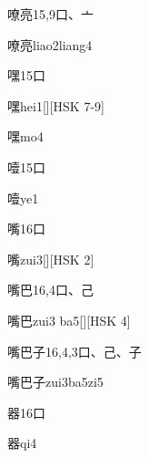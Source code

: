 \begin{Entry}{嘹亮}{15,9}{⼝、⼇}
  \begin{Phonetics}{嘹亮}{liao2liang4}
  \end{Phonetics}
\end{Entry}

\begin{Entry}{嘿}{15}{⼝}
  \begin{Phonetics}{嘿}{hei1}[][HSK 7-9]
  \end{Phonetics}
  \begin{Phonetics}{嘿}{mo4}
  \end{Phonetics}
\end{Entry}

\begin{Entry}{噎}{15}{⼝}
  \begin{Phonetics}{噎}{ye1}
  \end{Phonetics}
\end{Entry}

\begin{Entry}{嘴}{16}{⼝}
  \begin{Phonetics}{嘴}{zui3}[][HSK 2]
  \end{Phonetics}
\end{Entry}

\begin{Entry}{嘴巴}{16,4}{⼝、⼰}
  \begin{Phonetics}{嘴巴}{zui3 ba5}[][HSK 4]
  \end{Phonetics}
\end{Entry}

\begin{Entry}{嘴巴子}{16,4,3}{⼝、⼰、⼦}
  \begin{Phonetics}{嘴巴子}{zui3ba5zi5}
  \end{Phonetics}
\end{Entry}

\begin{Entry}{器}{16}{⼝}
  \begin{Phonetics}{器}{qi4}
  \end{Phonetics}
\end{Entry}

